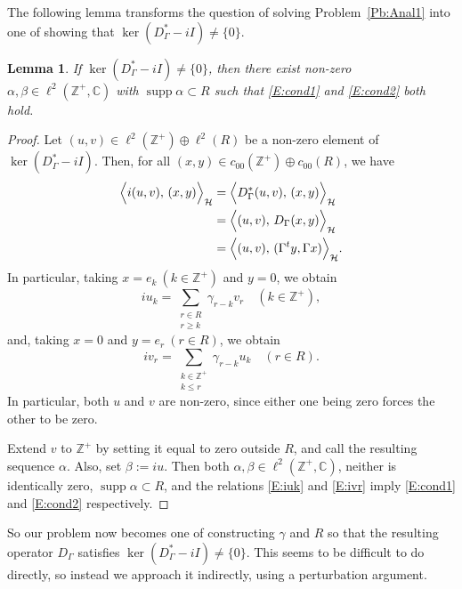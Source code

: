 \documentclass[11pt,reqno]{amsart}
\theoremstyle{plain}
\newtheorem{lemma}[theorem]{Lemma}
\theoremstyle{definition}
\theoremstyle{remark}
\newcommand{\cH}{\mathcal{H}}
\newcommand{\CC}{\mathbb{C}}
\newcommand{\ZZ}{\mathbb{Z}}
\DeclareMathOperator{\supp}{supp}
\begin{document}
The following lemma transforms the question of solving
Problem~\ref{Pb:Anal1} into one of showing that
$\ker(D_\Gamma^*-i I)\ne\{0\}$.

\begin{lemma}\label{L:ker}
If
$\ker(D_\Gamma^*-i I)\ne\{0\}$,
then there exist non-zero $\alpha,\beta\in\ell^2(\ZZ^+,\CC)$
with $\supp\alpha\subset R$ such that \eqref{E:cond1} and \eqref{E:cond2} both hold.
\end{lemma}

\begin{proof}
Let $(u,v)\in\ell^2(\ZZ^+)\oplus\ell^2(R)$ 
be a non-zero element of $\ker(D_\Gamma^*-iI)$.
Then, for all $(x,y)\in c_{00}(\ZZ^+)\oplus c_{00}(R)$, we have
\begin{align*}
\Bigl\langle i(u,v),\,(x,y)\Bigr\rangle_{\cH}
&=\Bigl\langle D_\Gamma^*(u,v),\,(x,y)\Bigr\rangle_{\cH}\\
&=\Bigl\langle (u,v),\,D_\Gamma(x,y)\Bigr\rangle_{\cH}\\
&=\Bigl\langle (u,v),\,(\Gamma^t y,\Gamma x)\Bigr\rangle_{\cH}.
\end{align*}
In particular, taking $x=e_k~(k\in\ZZ^+)$ and $y=0$, we obtain
\begin{equation}\label{E:iuk}
iu_k=\sum_{\substack{r\in R\\r\ge k}}\gamma_{r-k}v_r \quad(k\in\ZZ^+),
\end{equation}
and, taking $x=0$ and $y=e_r~(r\in R)$, we obtain
\begin{equation}\label{E:ivr}
iv_r=\sum_{\substack{k\in\ZZ^+\\k\le r}}\gamma_{r-k}u_k \quad(r\in R).
\end{equation}
In particular, both $u$ and $v$ are non-zero, since either
one being zero forces the other to be zero.

Extend $v$ to $\ZZ^+$ by setting  it equal to zero outside $R$,
and call the resulting sequence $\alpha$. Also, set $\beta:=iu$.
Then both $\alpha,\beta\in\ell^2(\ZZ^+,\CC)$, neither is identically zero, 
$\supp\alpha\subset R$, and the relations \eqref{E:iuk}
and \eqref{E:ivr} imply \eqref{E:cond1} and \eqref{E:cond2} respectively.
\end{proof}

So our problem now becomes one of constructing 
$\gamma$ and $R$ so that the resulting operator $D_\Gamma$
satisfies $\ker(D_\Gamma^*-iI)\ne\{0\}$. 
This seems to be  difficult to do directly, so instead we approach 
it indirectly, using a perturbation argument.
\end{document}
